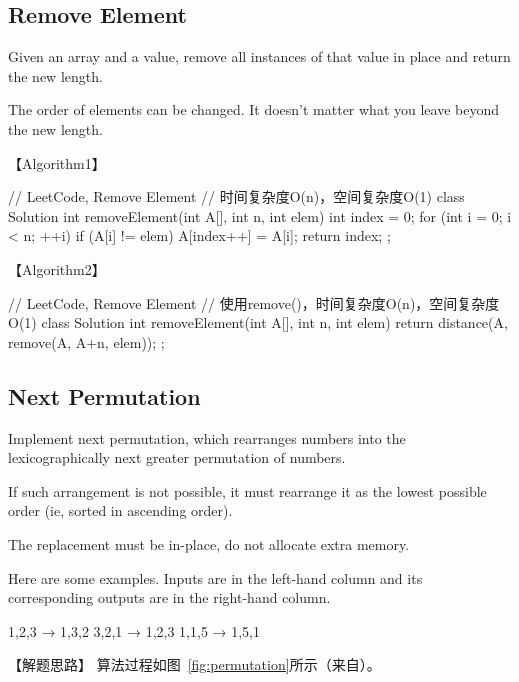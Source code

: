 \subsection{Remove Element} %
\label{sec:remove-element }



Given an array and a value, remove all instances of that value in place and
return the new length.

The order of elements can be changed. It doesn't matter what you leave beyond
the new length.

【Algorithm1】
\begin{Code}
	// LeetCode, Remove Element
	// 时间复杂度O(n)，空间复杂度O(1)
	class Solution {
		int removeElement(int A[], int n, int elem) {
			int index = 0;
			for (int i = 0; i < n; ++i) {
				if (A[i] != elem)
					A[index++] = A[i];
			}
			return index;
		}
	};
\end{Code}


【Algorithm2】
\begin{Code}
	// LeetCode, Remove Element
	// 使用remove()，时间复杂度O(n)，空间复杂度O(1)
	class Solution {
		int removeElement(int A[], int n, int elem) {
			return distance(A, remove(A, A+n, elem));
		}
	};
\end{Code}


\subsection{Next Permutation} %
\label{sec:next-permutation}



Implement next permutation, which rearranges numbers into the lexicographically
next greater permutation of numbers.

If such arrangement is not possible, it must rearrange it as the lowest
possible order (ie, sorted in ascending order).

The replacement must be in-place, do not allocate extra memory.

Here are some examples. Inputs are in the left-hand column and its
corresponding outputs are in the right-hand column.
\begin{Code}
	1,2,3 → 1,3,2
	3,2,1 → 1,2,3
	1,1,5 → 1,5,1
\end{Code}


【解题思路】
算法过程如图~\ref{fig:permutation}所示（来自）。

